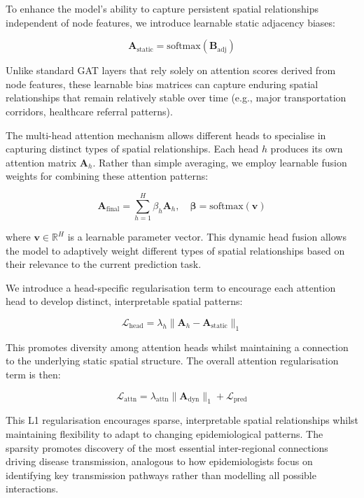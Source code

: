 \documentclass[lettersize, journal]{IEEEtran}
\begin{document}
To enhance the model's ability to capture persistent spatial relationships independent of node features, we introduce learnable static adjacency biases:

\begin{equation}
\mathbf{A}_{\text{static}} = \text{softmax}(\mathbf{B}_{\text{adj}})
\end{equation}

Unlike standard GAT layers that rely solely on attention scores derived from node features, these learnable bias matrices can capture enduring spatial relationships that remain relatively stable over time (e.g., major transportation corridors, healthcare referral patterns).

The multi-head attention mechanism allows different heads to specialise in capturing distinct types of spatial relationships. Each head $h$ produces its own attention matrix $\mathbf{A}_{h}$. Rather than simple averaging, we employ learnable fusion weights for combining these attention patterns:

\begin{equation}
\mathbf{A}_{\text{final}} = \sum_{h=1}^H \beta_h \mathbf{A}_h, \quad \boldsymbol{\beta} = \text{softmax}(\mathbf{v})
\end{equation}

where $\mathbf{v} \in \mathbb{R}^H$ is a learnable parameter vector. This dynamic head fusion allows the model to adaptively weight different types of spatial relationships based on their relevance to the current prediction task.

We introduce a head-specific regularisation term to encourage each attention head to develop distinct, interpretable spatial patterns:

\begin{equation}
\mathcal{L}_{\text{head}} = \lambda_{h}\|\mathbf{A}_{h} - \mathbf{A}_{\text{static}}\|_1
\end{equation}

This promotes diversity among attention heads whilst maintaining a connection to the underlying static spatial structure. The overall attention regularisation term is then:

\begin{equation}
\mathcal{L}_{\text{attn}} = \lambda_{\text{attn}}\|\mathbf{A}_{\text{dyn}}\|_1 + \mathcal{L}_{\text{pred}}
\end{equation}

This L1 regularisation encourages sparse, interpretable spatial relationships whilst maintaining flexibility to adapt to changing epidemiological patterns. The sparsity promotes discovery of the most essential inter-regional connections driving disease transmission, analogous to how epidemiologists focus on identifying key transmission pathways rather than modelling all possible interactions.
\end{document}
